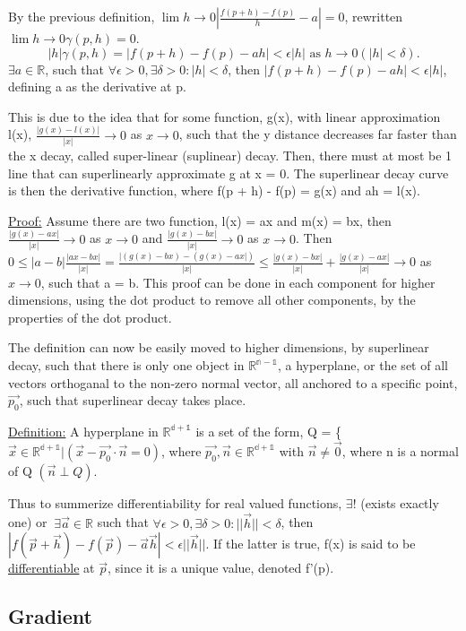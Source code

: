 \documentclass[11 pt, twoside]{article}
\begin{document}
By the previous definition, $\lim{h \to 0} |\frac{f(p+h) - f(p)}{h} - a| = 0$, rewritten  $\lim{h \to 0} \gamma(p, h) = 0$. $$ |h|\gamma(p, h) = |f(p+h) - f(p) - ah| < \epsilon|h| \text{ as } h \to 0 (|h| < \delta).$$ $\exists a \in \mathbb{R}$, such that $\forall \epsilon > 0, \exists \delta > 0: |h| < \delta$, then $|f(p + h) - f(p) - ah| < \epsilon|h|$, defining a as the derivative at p.

This is due to the idea that for some function, g(x), with linear approximation l(x), $\frac{|g(x) - l(x)|}{|x|} \to 0$ as $x \to 0$, such that the y distance decreases far faster than the x decay, called super-linear (suplinear) decay. Then, there must at most be 1 line that can superlinearly approximate g at x = 0. The superlinear decay curve is then the derivative function, where f(p + h) - f(p) = g(x) and ah = l(x).

\underline{Proof:}
Assume there are two function, l(x) = ax and m(x) = bx, then $\frac{|g(x) - ax|}{|x|} \to 0$ as $x \to 0$ and $\frac{|g(x) - bx|}{|x|} \to 0$ as $x \to 0$. Then $0 \leq |a - b| \frac{|ax - bx|}{|x|} = \frac{|(g(x) - bx) - (g(x) - ax|)}{|x|} \leq \frac{|g(x) - bx|}{|x|} + \frac{|g(x) - ax|}{|x|} \to 0$ as $x \to 0$, such that a = b. This proof can be done in each component for higher dimensions, using the dot product to remove all other components, by the properties of the dot product.

The definition can now be easily moved to higher dimensions, by superlinear decay, such that there is only one object in $\mathbb{R^{n-1}}$, a hyperplane, or the set of all vectors orthoganal to the non-zero normal vector, all anchored to a specific point, $\vec{p_0}$, such that superlinear decay takes place.

\underline{Definition:}
A hyperplane in $\mathbb{R^{d+1}}$ is a set of the form, Q = \{$\vec{x} \in \mathbb{R^{d+1}} | (\vec{x} - \vec{p_0} \cdot \vec{n} = 0)$, where $\vec{p_0}, \vec{n} \in \mathbb{R^{d+1}}$ with $\vec{n} \neq \vec{0}$, where n is a normal of Q $(\vec{n} \perp Q)$.

Thus to summerize differentiability for real valued functions, $\exists !$ (exists exactly one) or $~\exists \vec{a} \in \mathbb{R}$ such that $\forall \epsilon > 0, \exists \delta > 0: ||\vec{h}|| < \delta$, then $|f(\vec{p} + \vec{h}) - f(\vec{p}) - \vec{a}\vec{h}| < \epsilon||\vec{h}||$. If the latter is true, f(x) is said to be \underline{differentiable} at $\vec{p}$, since it is a unique value, denoted f'(p). 

\subsection{Gradient}
\end{document}
